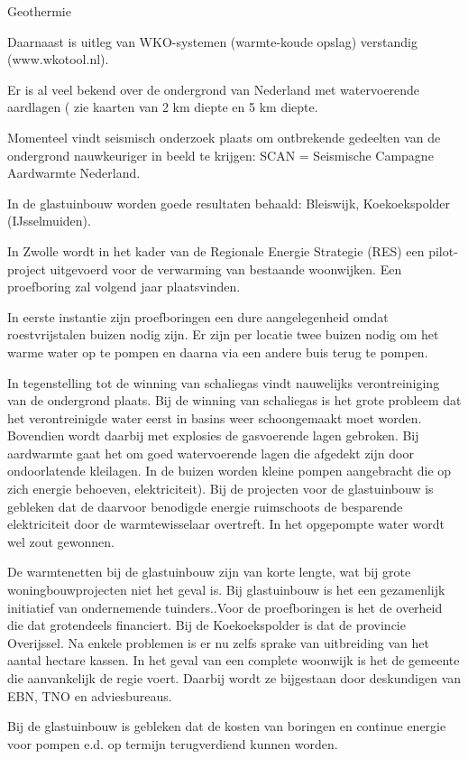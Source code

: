 \begin{voorstel}{Geothermie}
\begin{overwegingen}
Daarnaast is uitleg van WKO-systemen (warmte-koude opslag) verstandig (www.wkotool.nl).

Er is al veel bekend over de ondergrond van Nederland met watervoerende aardlagen ( zie kaarten van 2 km diepte en 5 km diepte.

Momenteel vindt seismisch onderzoek plaats om ontbrekende gedeelten van de ondergrond nauwkeuriger in beeld te krijgen: SCAN = Seismische Campagne Aardwarmte Nederland.

In de glastuinbouw worden goede resultaten behaald: Bleiswijk, Koekoekspolder (IJsselmuiden).

In Zwolle wordt in het kader van de Regionale Energie Strategie (RES) een pilot-project uitgevoerd voor de verwarming van bestaande woonwijken. Een proefboring zal volgend jaar plaatsvinden.

In eerste instantie zijn proefboringen een dure aangelegenheid omdat roestvrijstalen buizen nodig zijn. Er zijn per locatie twee buizen nodig om het warme water op te pompen en daarna via een andere buis terug te pompen.

In tegenstelling tot de winning van schaliegas vindt nauwelijks verontreiniging van de ondergrond plaats. Bij de winning van schaliegas is het grote probleem dat het verontreinigde water eerst in basins weer schoongemaakt moet worden. Bovendien wordt daarbij met explosies de gasvoerende lagen gebroken. Bij aardwarmte gaat het om goed watervoerende lagen die afgedekt zijn door ondoorlatende kleilagen. In de buizen worden kleine pompen aangebracht die op zich energie behoeven, elektriciteit). Bij de projecten voor de glastuinbouw is gebleken dat de daarvoor benodigde energie ruimschoots de besparende elektriciteit door de warmtewisselaar overtreft. In het opgepompte water wordt wel zout gewonnen.

De warmtenetten bij de glastuinbouw zijn van korte lengte, wat bij grote woningbouwprojecten niet het geval is. Bij glastuinbouw is het een gezamenlijk initiatief van ondernemende tuinders..Voor de proefboringen is het de overheid die dat grotendeels financiert. Bij de Koekoekspolder is dat de provincie Overijssel. Na enkele problemen is er nu zelfs sprake van uitbreiding van het aantal hectare kassen. In het geval van een complete woonwijk is het de gemeente die aanvankelijk de regie voert. Daarbij wordt ze bijgestaan door deskundigen van EBN, TNO en adviesbureaus.

Bij de glastuinbouw is gebleken dat de kosten van boringen en continue energie voor pompen e.d. op termijn terugverdiend kunnen worden.


\end{overwegingen}
\end{voorstel}
